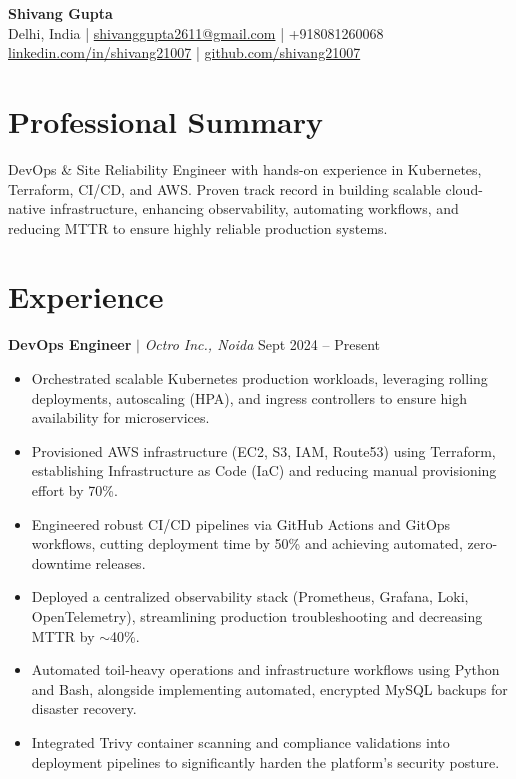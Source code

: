 \documentclass[11pt, letterpaper]{article}
\begin{document}
\begin{center}
    {\LARGE \textbf{Shivang Gupta}} \\ \vspace{2pt}
    Delhi, India \;|\;
    \href{mailto:shivanggupta2611@gmail.com}{shivanggupta2611@gmail.com} \;|\;
    +918081260068 \\ \vspace{2pt}
    \href{https://linkedin.com/in/shivang21007}{linkedin.com/in/shivang21007} \;|\;
    \href{https://github.com/shivang21007}{github.com/shivang21007}
\end{center}

\section*{Professional Summary}
\vspace{2pt}
DevOps \& Site Reliability Engineer with hands-on experience in Kubernetes, Terraform, CI/CD, and AWS. Proven track record in building scalable cloud-native infrastructure, enhancing observability, automating workflows, and reducing MTTR to ensure highly reliable production systems.

\section*{Experience}

\vspace{2pt}
\textbf{DevOps Engineer} $|$ \emph{Octro Inc., Noida} \hfill Sept 2024 -- Present
\begin{itemize}
    \item Orchestrated scalable Kubernetes production workloads, leveraging rolling deployments, autoscaling (HPA), and ingress controllers to ensure high availability for microservices.
    \item Provisioned AWS infrastructure (EC2, S3, IAM, Route53) using Terraform, establishing Infrastructure as Code (IaC) and reducing manual provisioning effort by 70\%.
    \item Engineered robust CI/CD pipelines via GitHub Actions and GitOps workflows, cutting deployment time by 50\% and achieving automated, zero-downtime releases.
    \item Deployed a centralized observability stack (Prometheus, Grafana, Loki, OpenTelemetry), streamlining production troubleshooting and decreasing MTTR by $\sim$40\%.
    \item Automated toil-heavy operations and infrastructure workflows using Python and Bash, alongside implementing automated, encrypted MySQL backups for disaster recovery.
    \item Integrated Trivy container scanning and compliance validations into deployment pipelines to significantly harden the platform's security posture.
\end{itemize}
\end{document}

